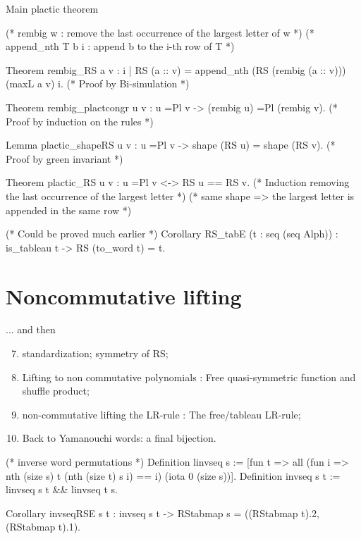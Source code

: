 \documentclass[compress,11pt]{beamer}
\begin{document}
\begin{frame}[fragile]{Main plactic theorem}

  \begin{coqcode}
(* rembig w : remove the last occurrence of the largest letter of w *)
(* append_nth T b i : append b to the i-th row of T *)

Theorem rembig_RS a v :
  {i | RS (a :: v) = append_nth (RS (rembig (a :: v))) (maxL a v) i}.
(* Proof by Bi-simulation *)

Theorem rembig_plactcongr u v : u =Pl v -> (rembig u) =Pl (rembig v).
(* Proof by induction on the rules *)

Lemma plactic_shapeRS u v : u =Pl v -> shape (RS u) = shape (RS v).
(* Proof by green invariant *)

Theorem plactic_RS u v : u =Pl v <-> RS u == RS v.
(* Induction removing the last occurrence of the largest letter *)
(* same shape => the largest letter is appended in the same row *)

(* Could be proved much earlier *)
Corollary RS_tabE (t : seq (seq Alph)) : is_tableau t -> RS (to_word t) = t.
  \end{coqcode}
\end{frame}

\section{Noncommutative lifting}
\begin{frame}[fragile]{... and then}

  \begin{enumerate}
    \setcounter{enumi}{6}
  \item standardization; symmetry of RS;
  \item Lifting to non commutative polynomials : Free quasi-symmetric function
    and shuffle product;
  \item non-commutative lifting the LR-rule : The free/tableau LR-rule;
  \item Back to Yamanouchi words: a final bijection.
  \end{enumerate}

  \begin{coqcode}
(* inverse word permutations *)
Definition linvseq s :=
  [fun t => all (fun i => nth (size s) t (nth (size t) s i) == i) 
    (iota 0 (size s))].
Definition invseq s t := linvseq s t && linvseq t s.

Corollary invseqRSE s t :
  invseq s t -> RStabmap s = ((RStabmap t).2, (RStabmap t).1).
  \end{coqcode}
\end{frame}
\end{document}
